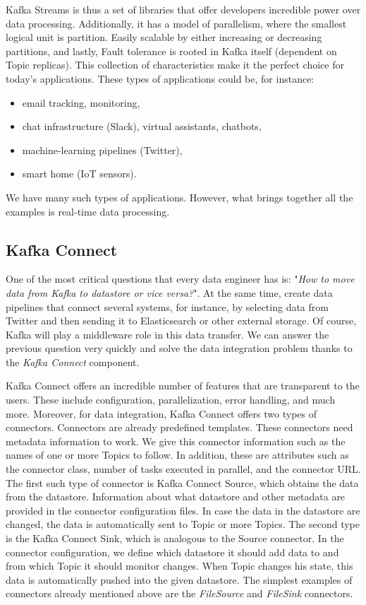 Kafka Streams is thus a set of libraries that offer developers incredible power over data processing. Additionally, it has a model of parallelism, where the smallest logical unit is partition. Easily scalable by either increasing or decreasing partitions, and lastly, Fault tolerance is rooted in Kafka itself (dependent on Topic replicas). This collection of characteristics make it the perfect choice for today's applications. These types of applications could be, for instance:
\begin{itemize}[itemsep=1mm, parsep=0pt]
    \item email tracking, monitoring,
    \item chat infrastructure (Slack), virtual assistants, chatbots,
    \item machine-learning pipelines (Twitter),
    \item smart home (IoT sensors).
\end{itemize}
We have many such types of applications. However, what brings together all the examples is real-time data processing.	

\subsection{Kafka Connect}

One of the most critical questions that every data engineer has is: "\emph{How to move data from Kafka to datastore or vice versa?}". At the same time, create data pipelines that connect several systems, for instance, by selecting data from Twitter and then sending it to Elasticsearch or other external storage. Of course, Kafka will play a middleware role in this data transfer. We can answer the previous question very quickly and solve the data integration problem thanks to the \emph{Kafka Connect} component.

Kafka Connect offers an incredible number of features that are transparent to the users. These include configuration, parallelization, error handling, and much more. Moreover, for data integration, Kafka Connect offers two types of connectors. Connectors are already predefined templates. These connectors need metadata information to work. We give this connector information such as the names of one or more Topics to follow. In addition, these are attributes such as the connector class, number of tasks executed in parallel, and the connector URL. The first such type of connector is Kafka Connect Source, which obtains the data from the datastore. Information about what datastore and other metadata are provided in the connector configuration files. In case the data in the datastore are changed, the data is automatically sent to Topic or more Topics. The second type is the Kafka Connect Sink, which is analogous to the Source connector. In the connector configuration, we define which datastore it should add data to and from which Topic it should monitor changes. When Topic changes his state, this data is automatically pushed into the given datastore. The simplest examples of connectors already mentioned above are the \emph{FileSource} and \emph{FileSink} connectors.

